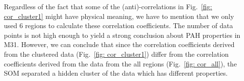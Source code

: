         
        
       Regardless of the fact that some of the (anti)-correlations in Fig.~\ref{fig: cor_cluster1} might have physical meaning, we have to mention that we only used 6 regions to calculate these correlation coefficients.
       The number of data points is not high enough to yield a strong conclusion about PAH properties in M31.%
        However, we can conclude that since the correlation coefficients derived from the clustered data (Fig.~\ref{fig: cor_cluster1}) differ from the correlation coefficients derived from the data from the all regions (Fig.~\ref{fig: cor_all}), the SOM separated a hidden cluster of the data which has different properties. %
        
        
        
        
        
